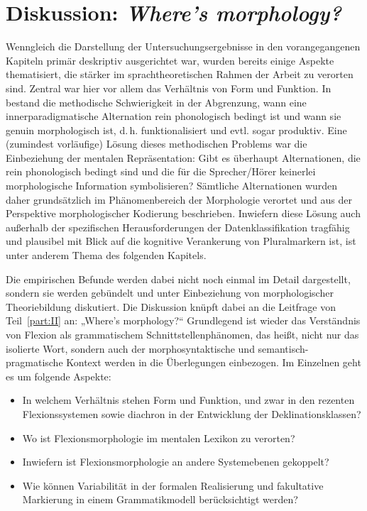 \chapter{Diskussion: \textit{Where’s morphology?}}
\label{chap:10}
Wenngleich die Darstellung der Untersuchungsergebnisse in den vorangegangenen Kapiteln primär deskriptiv ausgerichtet war, wurden bereits einige Aspekte thematisiert, die stärker im sprachtheoretischen Rahmen der Arbeit zu verorten sind. Zentral war hier vor allem das Verhältnis von Form und Funktion. In  bestand die methodische Schwierigkeit in der Abgrenzung, wann eine innerparadigmatische Alternation rein phonologisch bedingt ist und wann sie genuin morphologisch ist, d.\,h. funktionalisiert und evtl. sogar produktiv. Eine (zumindest vorläufige) Lösung dieses methodischen Problems war die Einbeziehung der mentalen Repräsentation: Gibt es überhaupt Alternationen, die rein phonologisch bedingt sind und die für die Sprecher/Hörer keinerlei morphologische Information symbolisieren? Sämtliche Alternationen wurden daher grundsätzlich im Phänomenbereich der Morphologie verortet und aus der Perspektive morphologischer Kodierung beschrieben. Inwiefern diese Lösung auch außerhalb der spezifischen Herausforderungen der Datenklassifikation tragfähig und plausibel mit Blick auf die kognitive Verankerung von Pluralmarkern ist, ist unter anderem Thema des folgenden Kapitels.

Die empirischen Befunde werden dabei nicht noch einmal im Detail dargestellt, sondern sie werden gebündelt und unter Einbeziehung von morphologischer Theoriebildung diskutiert. Die Diskussion knüpft dabei an die Leitfrage von Teil~\ref{part:II} an: „Where’s morphology?“ Grundlegend ist wieder das Verständnis von Flexion als grammatischem Schnittstellenphänomen, das heißt, nicht nur das isolierte Wort, sondern auch der morphosyntaktische und semantisch-pragmatische Kontext werden in die Überlegungen einbezogen. Im Einzelnen geht es um folgende Aspekte:

\begin{itemize}
\item In welchem Verhältnis stehen Form und Funktion, und zwar in den rezenten Flexionssystemen sowie diachron in der Entwicklung der Deklinationsklassen?
\item Wo ist Flexionsmorphologie im mentalen Lexikon zu verorten?
\item Inwiefern ist Flexionsmorphologie an andere Systemebenen gekoppelt?
\item Wie können Variabilität in der formalen Realisierung und fakultative Markierung in einem Grammatikmodell berücksichtigt werden?
\end{itemize}

